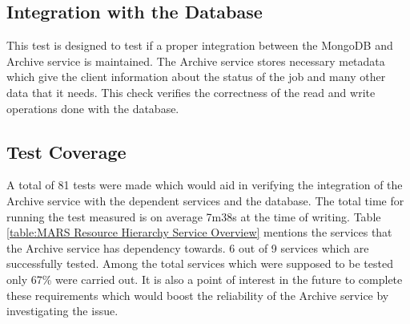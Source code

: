 \subsection{Integration with the Database}
This test is designed to test if a proper integration between the MongoDB and Archive service is maintained. The Archive service stores necessary metadata
which give the client information about the status of the job and many other data that it needs. This check verifies the correctness of the read and write 
operations done with the database. 

\subsection{Test Coverage}
A total of 81 tests were made which would aid in verifying the integration of the Archive service with the dependent services and the database. The 
total time for running the test measured is on average 7m38s at the time of writing. Table \ref{table:MARS Resource Hierarchy Service Overview}
mentions the services that the Archive service has dependency towards. 6 out of 9 services which are successfully tested. Among the total services 
which were supposed to be tested only 67\%  were carried out. It is also a point of interest in the future to complete these requirements which would boost the
reliability of the Archive service by investigating the issue.  
